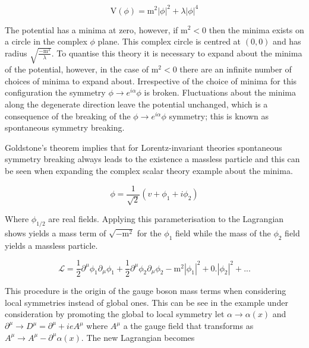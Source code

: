 \begin{equation}
\text{V}(\phi) = \text{m}^{2}|\phi|^{2} + \lambda |\phi|^{4}
\end{equation}

The potential has a minima at zero, however, if $\text{m}^{2} < 0$ then the minima exists on a circle in the complex $\phi$ plane.  This complex circle is centred at $(0,0)$ and has radius $\sqrt{\frac{-\text{m}^{2}}{\lambda}}$.  To quantise this theory it is necessary to expand about the minima of the potential, however, in the case of $\text{m}^{2} < 0$ there are an infinite number of choices of minima to expand about.  Irrespective of the choice of minima for this configuration the symmetry $\phi \rightarrow e^{i\alpha} \phi$ is broken.  Fluctuations about the minima along the degenerate direction leave the potential unchanged, which is a consequence of the breaking of the $\phi \rightarrow e^{i\alpha} \phi$ symmetry; this is known as spontaneous symmetry breaking.

Goldstone's theorem implies that for Lorentz-invariant theories spontaneous symmetry breaking always leads to the existence a massless particle and this can be seen when expanding the complex scalar theory example about the minima.

\begin{equation}
\phi = \frac{1}{\sqrt{2}}(v + \phi_{1} + i \phi_{2})
\end{equation}

Where $\phi_{1/2}$ are real fields.  Applying this parameterisation to the Lagrangian shows yields a mass term of $\sqrt{-\text{m}^{2}}$ for the $\phi_{1}$ field while the mass of the $\phi_{2}$ field yields a massless particle.  

\begin{equation}
\mathcal{L} = \frac{1}{2}\partial^{\mu} \phi_{1} \partial_{\mu} \phi_{1} + \frac{1}{2}\partial^{\mu} \phi_{2} \partial_{\mu} \phi_{2} - \text{m}^{2}|\phi_{1}|^{2} + 0.|\phi_{2}|^{2} + ...
\end{equation}

This procedure is the origin of the gauge boson mass terms when considering local symmetries instead of global ones.  This can be see in the example under consideration by promoting the global to local symmetry let $\alpha \rightarrow \alpha(x)$ and $\partial^{\mu} \rightarrow D^{\mu} = \partial^{\mu} + ieA^{\mu}$ where $A^{\mu}$ a the gauge field that transforms as $A^{\mu} \rightarrow A^{\mu} - \partial^{\mu}\alpha(x)$.  The new Lagrangian becomes

